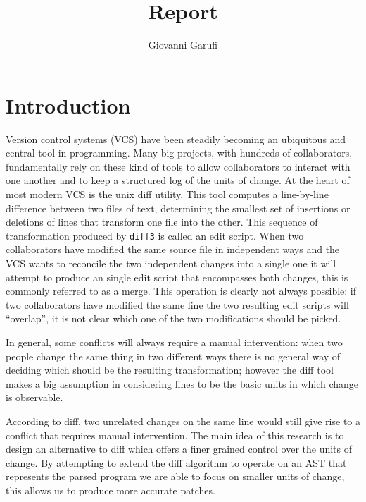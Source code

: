 \documentclass[11pt]{article}
\title{Report}
\author{Giovanni Garufi}
\date{}
\begin{document}
  

\newcommand{\diff}{\texttt{diff3}\xspace}
\newcommand{\SOP}{SOP\xspace}
\newcommand{\alins}{\texttt{Alins}\xspace}
\newcommand{\aldel}{\texttt{Aldel}\xspace}
\newcommand{\alspn}{\texttt{Alspn}\xspace}
\newcommand{\scp}{\texttt{Scp}\xspace}
\newcommand{\scns}{\texttt{Scns}\xspace}
\newcommand{\schg}{\texttt{Schg}\xspace}
\newcommand{\ains}{\texttt{Ains}\xspace}
\newcommand{\adel}{\texttt{Adel}\xspace}
\newcommand{\amod}{\texttt{Amod}\xspace}
\newcommand{\azero}{\texttt{A0}\xspace}

\maketitle

\section{Introduction}
Version control systems (VCS) have been steadily becoming an ubiquitous and central 
tool in programming. Many big projects, with hundreds of collaborators, 
fundamentally rely on these kind of tools to allow collaborators to interact 
with one another and to keep a structured log of the units of change. 
At the heart of most modern VCS is the unix diff utility. This tool computes a 
line-by-line difference between two files of text, determining the smallest set 
of insertions or deletions of lines that transform one file into the other. This sequence of transformation 
produced by \diff is called an edit script. 
When two collaborators have modified the same source file in independent 
ways and the VCS wants to reconcile the two independent changes into a single 
one it will attempt to produce an single edit script that encompasses both changes, this is commonly referred to 
as a merge. This operation is clearly not always possible: if two collaborators have 
modified the same line the two resulting edit scripts will 
``overlap'', it is not clear which one of the two modifications should be 
picked.  

In general, some conflicts will always require a manual intervention: when two 
people change the same thing in two different ways there is no general way of 
deciding which should be the resulting transformation; however the diff tool makes 
a big assumption in considering lines to be the basic units in which change is 
observable.  

According to diff, two unrelated changes on the same line would still give rise to a 
conflict that requires manual intervention. 
The main idea of this research is to design an alternative to diff which offers a 
finer grained control over the units of change. By attempting to extend the diff algorithm to operate on an AST that 
represents the parsed program we are able to focus on smaller units of change, this allows us to produce 
more accurate patches. 
\end{document}
